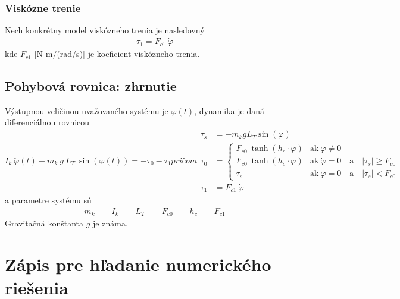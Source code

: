 \documentclass[a4paper, 10pt, ]{article}
\begin{document}
\subsubsection{Viskózne trenie}
Nech konkrétny model viskózneho trenia je nasledovný
\begin{align}
    \tau_1 = F_{c1} \ \dot \varphi
\end{align}
kde $F_{c1}$ [N m/(rad/s)] je koeficient viskózneho trenia.




\subsection{Pohybová rovnica: zhrnutie}

Výstupnou veličinou uvažovaného systému je $\varphi(t)$, dynamika je daná diferenciálnou rovnicou
\begin{subequations}
\begin{equation} 
    I_k \  \ddot\varphi(t) + m_k \  g \   L_T \  \sin(\varphi(t)) = - \tau_0 - \tau_1
\end{equation}
pričom
\begin{align}
    \tau_s &= - m_k g L_T \sin(\varphi) \\
    \tau_0 &= 
    \begin{cases} 
        F_{c0} \ \tanh(h_c\cdot \dot \varphi) & \text{ak}   \ \dot \varphi \neq 0  \\
        F_{c0} \ \tanh(h_c\cdot      \varphi) & \text{ak}   \ \dot \varphi = 0 \quad \text{a} \quad \left|\tau_s\right| \geq F_{c0} \\
        \tau_s &  \text{ak}  \ \dot \varphi = 0 \quad \text{a} \quad \left|\tau_s\right| < F_{c0}
    \end{cases}  \\
    \tau_1 &= F_{c1} \ \dot \varphi
\end{align}
\end{subequations}
a parametre systému sú
\begin{align}
    m_k \qquad I_k \qquad L_T \qquad F_{c0} \qquad h_c \qquad F_{c1}
\end{align}
Gravitačná konštanta $g$ je známa.


\section{Zápis pre hľadanie numerického riešenia}
\end{document}

